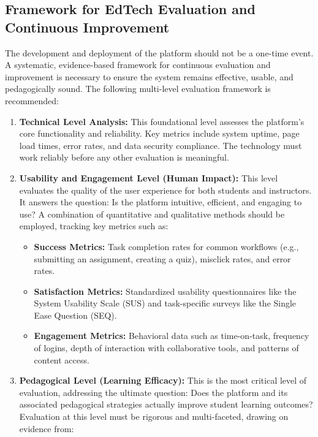 \documentclass{article}
\begin{document}
\subsection{Framework for EdTech Evaluation and Continuous Improvement}

The development and deployment of the platform should not be a one-time event. A systematic, evidence-based framework for continuous evaluation and improvement is necessary to ensure the system remains effective, usable, and pedagogically sound.\cite{112, 113} The following multi-level evaluation framework is recommended:

\begin{enumerate}
    \item \textbf{Technical Level Analysis:} This foundational level assesses the platform's core functionality and reliability. Key metrics include system uptime, page load times, error rates, and data security compliance.\cite{113} The technology must work reliably before any other evaluation is meaningful.
    \item \textbf{Usability and Engagement Level (Human Impact):} This level evaluates the quality of the user experience for both students and instructors. It answers the question: Is the platform intuitive, efficient, and engaging to use? A combination of quantitative and qualitative methods should be employed, tracking key metrics such as:
    \begin{itemize}
        \item \textbf{Success Metrics:} Task completion rates for common workflows (e.g., submitting an assignment, creating a quiz), misclick rates, and error rates.\cite{114}
        \item \textbf{Satisfaction Metrics:} Standardized usability questionnaires like the System Usability Scale (SUS) and task-specific surveys like the Single Ease Question (SEQ).\cite{114}
        \item \textbf{Engagement Metrics:} Behavioral data such as time-on-task, frequency of logins, depth of interaction with collaborative tools, and patterns of content access.
    \end{itemize}
    \item \textbf{Pedagogical Level (Learning Efficacy):} This is the most critical level of evaluation, addressing the ultimate question: Does the platform and its associated pedagogical strategies actually improve student learning outcomes? Evaluation at this level must be rigorous and multi-faceted, drawing on evidence from:
    \begin{itemize}

\end{itemize}
\end{enumerate}
\end{document}
